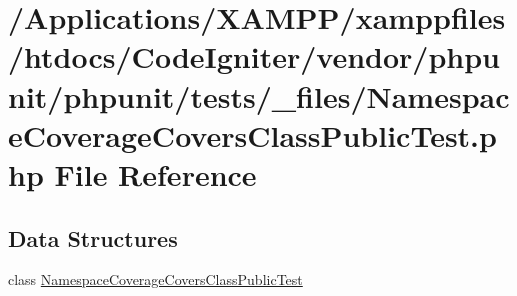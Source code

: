 \hypertarget{phpunit_2tests_2__files_2_namespace_coverage_covers_class_public_test_8php}{}\section{/\+Applications/\+X\+A\+M\+P\+P/xamppfiles/htdocs/\+Code\+Igniter/vendor/phpunit/phpunit/tests/\+\_\+files/\+Namespace\+Coverage\+Covers\+Class\+Public\+Test.php File Reference}
\label{phpunit_2tests_2__files_2_namespace_coverage_covers_class_public_test_8php}
\subsection*{Data Structures}
\begin{DoxyCompactItemize}
\item 
class \mbox{\hyperlink{class_namespace_coverage_covers_class_public_test}{Namespace\+Coverage\+Covers\+Class\+Public\+Test}}
\end{DoxyCompactItemize}
